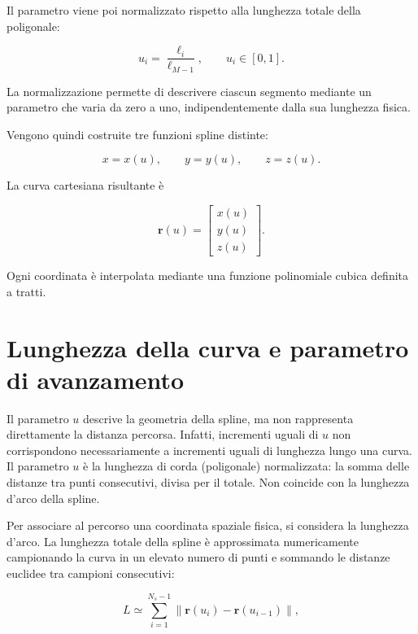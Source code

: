 Il parametro viene poi normalizzato rispetto alla lunghezza totale della poligonale:

\begin{equation}
    u_i = \frac{\ell_i}{\ell_{M-1}},
    \qquad u_i \in [0,1].
    \label{eq:parametro_spline}
\end{equation}

La normalizzazione permette di descrivere ciascun segmento mediante un parametro che varia da zero a uno, indipendentemente dalla sua lunghezza fisica.

Vengono quindi costruite tre funzioni spline distinte:

\begin{equation}
    x=x(u), \qquad y=y(u), \qquad z=z(u).
\end{equation}

La curva cartesiana risultante è

\begin{equation}
    \mathbf{r}(u)=
    \begin{bmatrix}
        x(u) \\
        y(u) \\
        z(u)
    \end{bmatrix}.
    \label{eq:curva_cartesiana}
\end{equation}

Ogni coordinata è interpolata mediante una funzione polinomiale cubica definita a tratti.

\section{Lunghezza della curva e parametro di avanzamento}

Il parametro $u$ descrive la geometria della spline, ma non rappresenta direttamente la distanza percorsa.
Infatti, incrementi uguali di $u$ non corrispondono necessariamente a incrementi uguali di lunghezza lungo una curva.
Il parametro $u$ è la lunghezza di corda (poligonale) normalizzata: la somma delle
distanze tra punti consecutivi, divisa per il totale. Non coincide con la
lunghezza d'arco della spline.

Per associare al percorso una coordinata spaziale fisica, si considera la lunghezza d'arco. La lunghezza totale della spline è approssimata numericamente campionando la curva in un elevato numero di punti e sommando le distanze euclidee tra campioni consecutivi:

\begin{equation}
    L \simeq
    \sum_{i=1}^{N_s-1}
    \left\|\mathbf{r}(u_i)-\mathbf{r}(u_{i-1})\right\|,
\end{equation}

